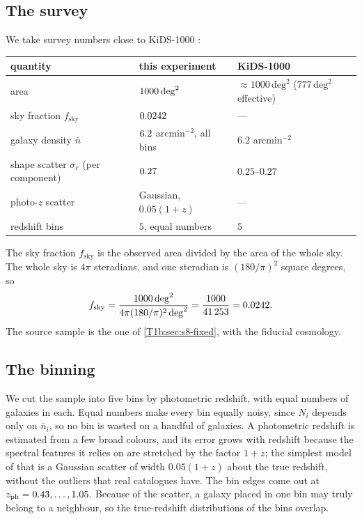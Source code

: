 \subsection{The survey}
\label{T1b:sec:noise-survey}

We take survey numbers close to KiDS-1000 \cite{Asgari2021KiDS}:

\begin{center}
\small
\begin{tabular}{@{}lll@{}}
\toprule
quantity & this experiment & KiDS-1000\\\midrule
area & $1000\,\mathrm{deg}^2$ & $\approx1000\,\mathrm{deg}^2$ ($777\,\mathrm{deg}^2$ effective)\\
sky fraction $f_{\mathrm{sky}}$ & $0.0242$ & ---\\
galaxy density $\bar n$ & $6.2$ arcmin$^{-2}$, all bins & $6.2$ arcmin$^{-2}$\\
shape scatter $\sigma_e$ (per component) & $0.27$ & $0.25$--$0.27$\\
photo-$z$ scatter & Gaussian, $0.05(1+z)$ & ---\\
redshift bins & $5$, equal numbers & $5$\\
\bottomrule
\end{tabular}
\end{center}

The sky fraction $f_{\mathrm{sky}}$ is the observed area divided by the area of the whole sky. The whole sky is $4\pi$ steradians, and one steradian is $(180/\pi)^2$ square degrees, so
\[
f_{\mathrm{sky}}=\frac{1000\,\mathrm{deg}^2}{4\pi(180/\pi)^2\,\mathrm{deg}^2}=\frac{1000}{41\,253}=0.0242 .
\]
The source sample is the one of \cref{T1b:sec:s8-fixed}, with the fiducial cosmology.

\subsection{The binning}
\label{T1b:sec:noise-bins}

We cut the sample into five bins by photometric redshift, with equal numbers of galaxies in each. Equal numbers make every bin equally noisy, since $N_i$ depends only on $\bar n_i$, so no bin is wasted on a handful of galaxies. A photometric redshift is estimated from a few broad colours, and its error grows with redshift because the spectral features it relies on are stretched by the factor $1+z$; the simplest model of that is a Gaussian scatter of width $0.05(1+z)$ about the true redshift, without the outliers that real catalogues have. The bin edges come out at $z_{\mathrm{ph}}=0.43,\dots,1.05$. Because of the scatter, a galaxy placed in one bin may truly belong to a neighbour, so the true-redshift distributions of the bins overlap.

